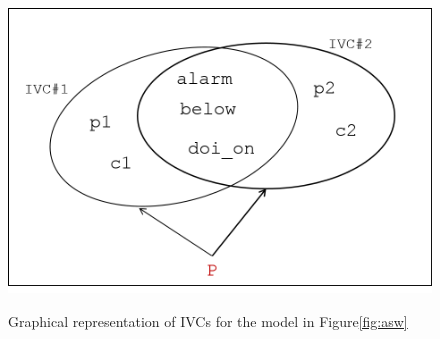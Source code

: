 \begin{figure}[t]
 \centering
  \includegraphics[width=0.9\columnwidth]{figs/ivcs.png}
  \label{fig:ivcs}
  \vspace{-0.1in}
  \caption{Graphical representation of IVCs for the model in Figure\ref{fig:asw}}
\end{figure}

%


